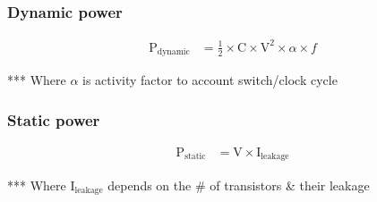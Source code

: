 \documentclass[11pt]{article}
\begin{document}
\subsubsection{Dynamic power}
\begin{align}
    \text{P}_{\text{dynamic}} &= \frac{1}{2} \times \text{C}  \times \text{V}^2 \times \alpha \times f
\end{align}
\begin{center}
    *** Where \(\alpha\) is activity factor to account switch/clock cycle
\end{center}
\subsubsection{Static power}
\begin{align}
    \text{P}_{\text{static}} &= \text{V}  \times \text{I}_\text{leakage}
\end{align}
\begin{center}
    *** Where \(\text{I}_{\text{leakage}}\) depends on the \# of transistors \& their leakage
\end{center}
\end{document}
